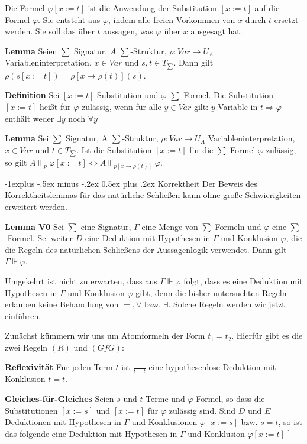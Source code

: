 \documentclass[a4paper]{article}
\makeatletter
\renewcommand{\note}[2]{\begin{noteBox} \textbf{#1} #2 \end{noteBox}}
\renewcommand{\subsection}{\@startsection{subsection}{2}{0mm}%
                {-1explus -.5ex minus -.2ex}%
                {0.5ex plus .2ex}%
                {\normalfont\normalsize\bfseries}}
\makeatother
\begin{document}
\begin{multicols}{3}
  Die Formel $\varphi[x:=t]$ ist die Anwendung der Substitution $[x:=t]$ auf die Formel $\varphi$. Sie entsteht aus $\varphi$, indem alle freien Vorkommen von $x$ durch $t$ ersetzt werden. Sie soll das über $t$ aussagen, was $\varphi$ über $x$ ausgesagt hat.

  \note{Lemma}{Seien $\sum$ Signatur, $A$ $\sum$-Struktur, $\rho:Var\rightarrow U_A$ Variableninterpretation, $x\in Var$ und $s,t\in T_{\sum}$. Dann gilt $\rho(s[x:=t])=\rho[x\rightarrow \rho(t)](s)$.}

  \note{Definition}{Sei $[x:=t]$ Substitution und $\varphi$ $\sum$-Formel. Die Substitution $[x:=t]$ heißt für $\varphi$ zulässig, wenn für alle $y\in Var$ gilt: $y$ Variable in $t\Rightarrow\varphi$ enthält weder $\exists y$ noch $\forall y$}

  \note{Lemma}{Sei $\sum$ Signatur, A $\sum$-Struktur, $\rho:Var\rightarrow U_A$ Variableninterpretation, $x\in Var$ und $t\in T_{\sum}$. Ist die Substitution $[x:=t]$ für die $\sum$-Formel $\varphi$ zulässig, so gilt $A\Vdash_p\varphi [x:=t]\Leftrightarrow  A\Vdash_{p[x\rightarrow \rho(t)]}\varphi$.}

  \subsection{Korrektheit}
  Der Beweis des Korrektheitslemmas für das natürliche Schließen kann ohne große Schwierigkeiten erweitert werden.

  \note{Lemma V0}{Sei $\sum$ eine Signatur, $\Gamma$ eine Menge von $\sum$-Formeln und $\varphi$ eine $\sum$-Formel. Sei weiter $D$ eine Deduktion mit Hypothesen in $\Gamma$ und Konklusion $\varphi$, die die Regeln des natürlichen Schließens der Aussagenlogik verwendet. Dann gilt $\Gamma\Vdash\varphi$.}

  Umgekehrt ist nicht zu erwarten, dass aus $\Gamma\Vdash\varphi$ folgt, dass es eine Deduktion mit Hypothesen in $\Gamma$ und Konklusion $\varphi$ gibt, denn die bisher untersuchten Regeln erlauben keine Behandlung von $=,\forall$ bzw. $\exists$. Solche Regeln werden wir jetzt einführen.

  Zunächst kümmern wir uns um Atomformeln der Form $t_1 =t_2$. Hierfür gibt es die zwei Regeln $(R)$ und $(GfG)$:

  \note{Reflexivität}{Für jeden Term $t$ ist $\frac{}{t=t}$ eine hypothesenlose Deduktion mit Konklusion $t=t$.  %
  }

  \note{Gleiches-für-Gleiches}{Seien $s$ und $t$ Terme und $\varphi$ Formel, so dass die Substitutionen $[x:=s]$ und $[x:=t]$ für $\varphi$ zulässig sind. Sind $D$ und $E$ Deduktionen mit Hypothesen in $\Gamma$ und Konklusionen $\varphi[x:=s]$ bzw. $s=t$, so ist das folgende eine Deduktion mit Hypothesen in $\Gamma$ und Konklusion $\varphi[x:=t]$
  ]}


\end{multicols}
\end{document}
